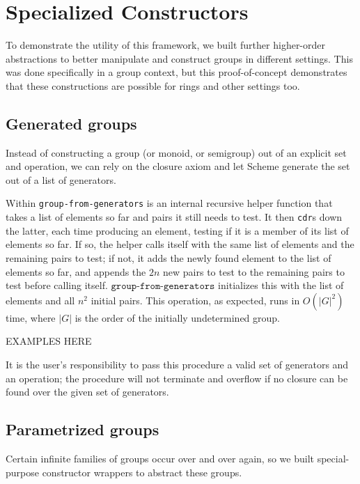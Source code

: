 \documentclass{article}
\begin{document}
    \section{Specialized Constructors}
        
        To demonstrate the utility of this framework, we built further higher-order abstractions to better manipulate and construct groups in different settings. This was done specifically in a group context, but this proof-of-concept demonstrates that these constructions are possible for rings and other settings too.
        
        \subsection{Generated groups}
        \label{generated-groups}
        
        Instead of constructing a group (or monoid, or semigroup) out of an explicit set and operation, we can rely on the closure axiom and let Scheme generate the set out of a list of generators.
        
         Within \texttt{group-from-generators} is an internal recursive helper function that takes a list of elements so far and pairs it still needs to test. It then \texttt{cdr}s down the latter, each time producing an element, testing if it is a member of its list of elements so far. If so, the helper calls itself with the same list of elements and the remaining pairs to test; if not, it adds the newly found element to the list of elements so far, and appends the $2n$ new pairs to test to the remaining pairs to test before calling itself. $\texttt{group-from-generators}$ initializes this with the list of elements and all $n^2$ initial pairs. This operation, as expected, runs in $O(|G|^2)$ time, where $|G|$ is the order of the initially undetermined group. 
         
         EXAMPLES HERE
         
         It is the user's responsibility to pass this procedure a valid set of generators and an operation; the procedure will not terminate and overflow if no closure can be found over the given set of generators.
        
        \subsection{Parametrized groups}
        
        Certain infinite families of groups occur over and over again, so we built special-purpose constructor wrappers to abstract these groups.
        
\end{document}
